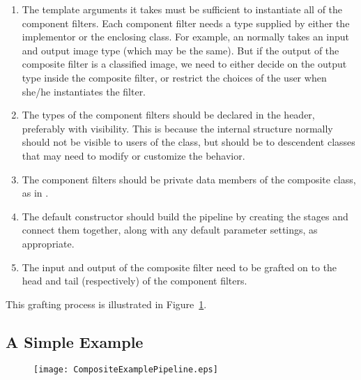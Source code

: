 \begin{enumerate}

\item The template arguments it takes must be sufficient to instantiate all of
the component filters.  Each component filter needs a type supplied by either
the implementor or the enclosing class.  For example, an
 normally takes an input and output image type (which
may be the same).  But if the output of the composite filter is a classified
image, we need to either decide on the output type inside the composite filter,
or restrict the choices of the user when she/he instantiates the filter.

\item The types of the component filters should be declared in the header,
  preferably with  visibility.  This is because the
  internal structure normally should not be visible to users of the class,
  but should be to descendent classes that may need to modify or customize
  the behavior. 

\item The component filters should be private data members of the composite
  class, as in . 

\item The default constructor should build the pipeline by creating the
  stages and connect them together, along with any default parameter
  settings, as appropriate. 

\item The input and output of the composite filter need to be grafted on to
  the head and tail (respectively) of the component filters. 

\end{enumerate}

This grafting process is illustrated in Figure~\ref{fig:CompositeExamplePipeline}. 


\subsection{A Simple Example}

\begin{figure}
  \centering
  \texttt{[image: CompositeExamplePipeline.eps]}
  \label{fig:CompositeExamplePipeline}
\end{figure}



